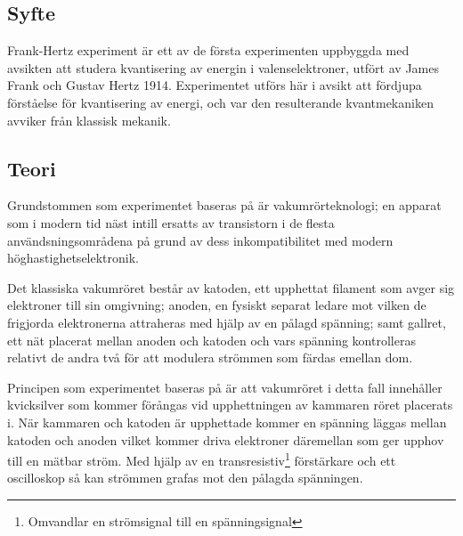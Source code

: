 \subsection*{Syfte}

Frank-Hertz experiment är ett av de första experimenten uppbyggda med avsikten att studera kvantisering av energin i valenselektroner, utfört av James Frank och Gustav Hertz 1914.  Experimentet utförs här i avsikt att fördjupa förståelse för kvantisering av energi, och var den resulterande kvantmekaniken avviker från klassisk mekanik.

\subsection*{Teori}

Grundstommen som experimentet baseras på är vakumrörteknologi; en apparat som i modern tid näst intill ersatts av transistorn i de flesta användsningsområdena på grund av dess inkompatibilitet med modern höghastighetselektronik.

Det klassiska vakumröret består av katoden, ett upphettat filament som avger sig elektroner till sin omgivning; anoden, en fysiskt separat ledare mot vilken de frigjorda elektronerna attraheras med hjälp av en pålagd spänning; samt gallret, ett nät placerat mellan anoden och katoden och vars spänning kontrolleras relativt de andra två för att modulera strömmen som färdas emellan dom.

Principen som experimentet baseras på är att vakumröret i detta fall innehåller kvicksilver som kommer förångas vid upphettningen av kammaren röret placerats i. När kammaren och katoden är upphettade kommer en spänning läggas mellan katoden och anoden vilket kommer driva elektroner däremellan som ger upphov till en mätbar ström. Med hjälp av en transresistiv\footnote{Omvandlar en strömsignal till en spänningsignal} förstärkare och ett oscilloskop så kan strömmen grafas mot den pålagda spänningen. 

